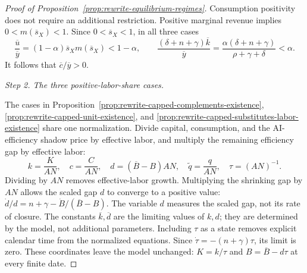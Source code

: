 \begin{proof}[Proof of Proposition~\ref{prop:rewrite-equilibrium-regimes}]
Consumption positivity does not require an additional restriction.
Positive marginal revenue implies $0<m(\overline s_X)<1$.
Since $0<\overline s_X<1$, in all three cases
\[
 \frac{\overline u}{\overline y}
 =(1-\alpha)\overline s_Xm(\overline s_X)<1-\alpha,\qquad
 \frac{(\delta+n+\gamma)\overline k}{\overline y}
 =\frac{\alpha(\delta+n+\gamma)}{\rho+\gamma+\delta}<\alpha.
\]
It follows that $\overline c/\overline y>0$.

\par\medskip\noindent\textit{Step 2. The three positive-labor-share cases.}

The cases in Proposition~\ref{prop:rewrite-capped-complements-existence},
\ref{prop:rewrite-capped-unit-existence}, and
\ref{prop:rewrite-capped-substitutes-labor-existence} share one
normalization. Divide capital, consumption, and the AI-efficiency shadow
price by effective labor, and multiply the remaining efficiency gap by
effective labor:
\begin{equation}
 k=\frac K{AN},\quad c=\frac C{AN},\quad
 d=(\overline B-B)AN,\quad \widetilde q=\frac q{AN},
 \quad \tau=(AN)^{-1}.
 \label{eq:rewrite-labor-proof-coordinates}
\end{equation}
Dividing by $AN$ removes effective-labor growth. Multiplying the shrinking
gap by $AN$ allows the scaled gap $d$ to converge to a positive value:
$\dot d/d=n+\gamma-\dot B/(\overline B-B)$.
The variable $d$ measures the scaled gap, not its rate of closure.
The constants $\overline k,\overline d$ are the limiting values of $k,d$;
they are determined by the model, not additional parameters.
Including $\tau$ as a state removes explicit calendar time from the
normalized equations. Since $\dot\tau=-(n+\gamma)\tau$, its limit is zero.
These coordinates leave the model unchanged: $K=k/\tau$ and
$B=\overline B-d\tau$ at every finite date.


\end{proof}
